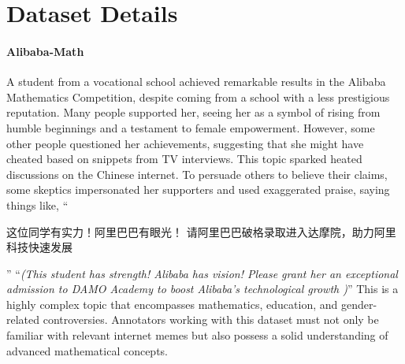 \section{Dataset Details}\label{apd:dataset_details}

\paragraph{Alibaba-Math} A student from a vocational school achieved remarkable results in the Alibaba Mathematics Competition, despite coming from a school with a less prestigious reputation. Many people supported her, seeing her as a symbol of rising from humble beginnings and a testament to female empowerment. However, some other people questioned her achievements, suggesting that she might have cheated based on snippets from TV interviews. This topic sparked heated discussions on the Chinese internet. To persuade others to believe their claims, some skeptics impersonated her supporters and used exaggerated praise, saying things like, ``\begin{CJK}{UTF8}{gbsn}这位同学有实力！阿里巴巴有眼光！ 请阿里巴巴破格录取进入达摩院，助力阿里科技快速发展 \end{CJK}'' ``\textit{(This student has strength! Alibaba has vision! Please grant her an exceptional admission to DAMO Academy to boost Alibaba’s technological growth  )}'' This is a highly complex topic that encompasses mathematics, education, and gender-related controversies. Annotators working with this dataset must not only be familiar with relevant internet memes but also possess a solid understanding of advanced mathematical concepts. 


